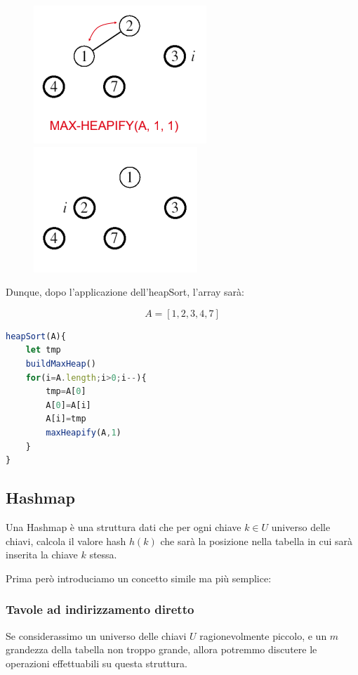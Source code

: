 \documentclass{article}
\begin{document}
    \begin{figure}[htbp]
        \center
        \includegraphics[scale=0.6]{img/heapSort5.png}
        \includegraphics[scale=0.6]{img/heapSort6.png}
    \end{figure}

    Dunque, dopo l'applicazione dell'heapSort, l'array sarà:

    \begin{equation}
        A=[1,2,3,4,7]
    \end{equation}

\begin{lstlisting}[language=JavaScript]
heapSort(A){
	let tmp
	buildMaxHeap()
	for(i=A.length;i>0;i--){
		tmp=A[0]
		A[0]=A[i]
		A[i]=tmp
		maxHeapify(A,1)	
	}
}
\end{lstlisting}

\newpage

\subsection{Hashmap}

Una Hashmap è una struttura dati che per ogni chiave $k \in U$ universo delle chiavi, calcola il valore hash $h(k)$ che sarà la posizione nella tabella in cui sarà inserita la chiave $k$ stessa.

Prima però introduciamo un concetto simile ma più semplice:

\subsubsection{Tavole ad indirizzamento diretto} Se considerassimo un universo delle chiavi $U$ ragionevolmente piccolo, e un $m$ grandezza della tabella non troppo grande, allora potremmo discutere le operazioni effettuabili su questa struttura.
\end{document}
